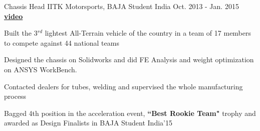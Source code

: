

\begin{cventries}
	\cventry
	{Chassis Head} %
	{IITK Motorsports, BAJA Student India} %
	{Oct. 2013 - Jan. 2015} %
	{
		\href{https://www.youtube.com/watch?v=8xSa60V9X4c}{\textbf{video \ExternalLink}}
	} %
	{
		\begin{cvitems} %
			\item {Built the 3$^{rd}$ lightest All-Terrain vehicle of the country in a team of 17 members to compete against 44 national teams}
			\item { Designed the chassis on Solidworks and did FE Analysis and weight optimization on ANSYS WorkBench.}
			\item {
				Contacted dealers for tubes, welding and supervised the whole manufacturing process
			}
			\item { Bagged 4th position in the acceleration event, \textbf{``Best Rookie Team"} trophy and awarded as Design Finalists in BAJA Student India’15 }
		\end{cvitems}
	}

  
\end{cventries}
